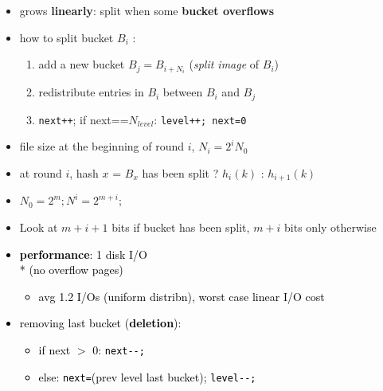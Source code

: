 \documentclass[10pt, landscape]{article}
\begin{document}
\begin{multicols*}{4}
  \begin{itemize}
    \item grows \textbf{linearly}: split when some \textbf{bucket overflows}
    \item how to split bucket $B_i$ : 
      \begin{enumerate}
        \item add a new bucket $B_j = B_{i+N_i}$ (\textit{split image} of $B_i$)
        \item redistribute entries in $B_i$ between $B_i$ and $B_j$
        \item \texttt{next++}; if next==$N_{level}$: \texttt{level++; next=0}
      \end{enumerate}
    \item file size at the beginning of round $i$, $N_i = 2^iN_0$
    \item at round $i$, hash $x$ = $B_x$ has been split ? $h_i(k)$ : $h_{i+1}(k)$
    \item $N_0=2^m; N^i=2^{m+i};$
    \item Look at $m+i+1$ bits if bucket has been split, $m+i$ bits only otherwise
  \end{itemize}
  \begin{minipage}[c]{0.6\linewidth}{\textcolor{black}{
        \begin{itemize}
          \item \textbf{performance}: 1 disk I/O \\* (no overflow pages)
            \begin{itemize}
              \item avg 1.2 I/Os (uniform distribn), worst case linear I/O cost
            \end{itemize}
          \item removing last bucket (\textbf{deletion}): 
            \begin{itemize}
              \item if next $>$ 0: \texttt{next-{}-;}
              \item else: \texttt{next=}(prev level last bucket); \texttt{level-{}-;}
            \end{itemize}
        \end{itemize}
    }}
  \end{minipage}
  \begin{minipage}[c]{0.37\linewidth}

\end{minipage}
\end{multicols*}
\end{document}

